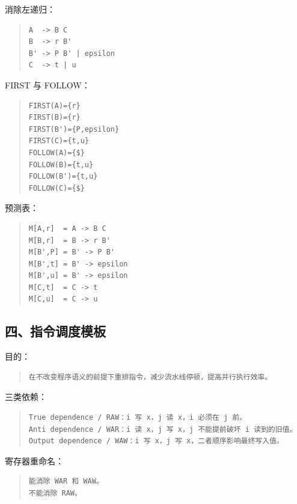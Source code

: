 \documentclass[UTF8,zihao=-4]{ctexart}
\begin{document}
消除左递归：


\begin{quote}
\footnotesize
\begin{verbatim}
A  -> B C
B  -> r B'
B' -> P B' | epsilon
C  -> t | u
\end{verbatim}
\end{quote}


FIRST 与 FOLLOW：


\begin{quote}
\footnotesize
\begin{verbatim}
FIRST(A)={r}
FIRST(B)={r}
FIRST(B')={P,epsilon}
FIRST(C)={t,u}
FOLLOW(A)={$}
FOLLOW(B)={t,u}
FOLLOW(B')={t,u}
FOLLOW(C)={$}
\end{verbatim}
\end{quote}


预测表：


\begin{quote}
\footnotesize
\begin{verbatim}
M[A,r]  = A -> B C
M[B,r]  = B -> r B'
M[B',P] = B' -> P B'
M[B',t] = B' -> epsilon
M[B',u] = B' -> epsilon
M[C,t]  = C -> t
M[C,u]  = C -> u
\end{verbatim}
\end{quote}


\subsection{四、指令调度模板}


目的：


\begin{quote}
\footnotesize
\begin{verbatim}
在不改变程序语义的前提下重排指令，减少流水线停顿，提高并行执行效率。
\end{verbatim}
\end{quote}


三类依赖：


\begin{quote}
\footnotesize
\begin{verbatim}
True dependence / RAW：i 写 x，j 读 x，i 必须在 j 前。
Anti dependence / WAR：i 读 x，j 写 x，j 不能提前破坏 i 读到的旧值。
Output dependence / WAW：i 写 x，j 写 x，二者顺序影响最终写入值。
\end{verbatim}
\end{quote}


寄存器重命名：


\begin{quote}
\footnotesize
\begin{verbatim}
能消除 WAR 和 WAW。
不能消除 RAW。
\end{verbatim}
\end{quote}
\end{document}
